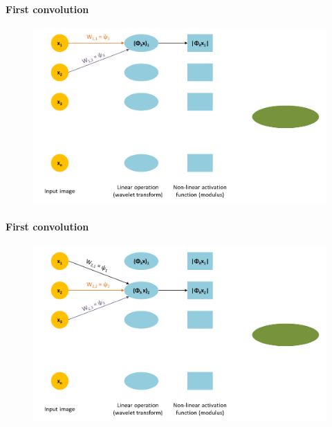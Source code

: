 \documentclass[10pt]{beamer}
\begin{document}
\begin{darkframes}
    \begin{frame}{\subsecname}
    \framesubtitle{First convolution}
    \begin{figure}
        \centering
        \includegraphics[width=\textwidth]{resources/convolution/CNN1.png}
    \end{figure}
    \end{frame}
    
    \begin{frame}{\subsecname}
    \framesubtitle{First convolution}
    \begin{figure}
        \centering
        \includegraphics[width=\textwidth]{resources/convolution/CNN2.png}
    \end{figure}
    \end{frame}
    

\end{darkframes}
\end{document}
